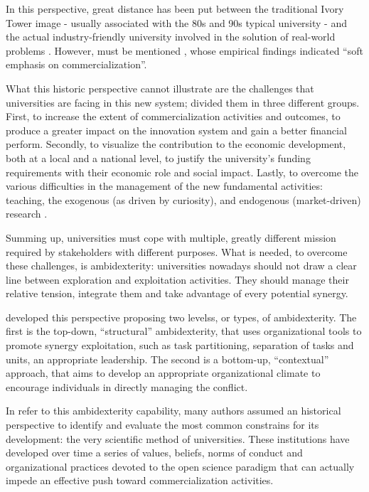 In this perspective, great distance has been put between the traditional Ivory Tower image - usually associated with the 80s and 90s typical university - and the actual industry-friendly university involved in the solution of real-world problems \citep{Baldini2006}. However, must be mentioned \citet{Rasmussen2006}, whose empirical findings indicated \enquote{soft emphasis on commercialization}.

What this historic perspective cannot illustrate are the challenges that universities are facing in this new system; \citet{Rasmussen2006} divided them in three different groups. First, to increase the extent of commercialization activities and outcomes, to produce a greater impact on the innovation system and gain a better financial perform. Secondly, to visualize the contribution to the economic development, both at a local and a national level, to justify the university's funding requirements with their economic role and social impact. Lastly, to overcome the various difficulties in the management of the new fundamental activities: teaching, the exogenous (as driven by curiosity), and endogenous (market-driven) research \citep{Debackere2005}. 

Summing up, universities must cope with multiple, greatly different mission required by stakeholders with different purposes. What is needed, to overcome these challenges, is ambidexterity: universities nowadays should not draw a clear line between exploration and exploitation activities. They should manage their relative tension, integrate them and take advantage of every potential synergy.

\citet{Chang2016} developed this perspective proposing two levelss, or types, of ambidexterity. The first is the top-down, \enquote{structural} ambidexterity, that uses organizational tools to promote synergy exploitation, such as task partitioning, separation of tasks and units, an appropriate leadership. The second is a bottom-up, \enquote{contextual} approach, that aims to develop an appropriate organizational climate to encourage individuals in directly managing the conflict.

In refer to this ambidexterity capability, many authors assumed an historical perspective to identify and evaluate the most common constrains for its development: the very scientific method of universities. These institutions have developed over time a series of values, beliefs, norms of conduct and organizational practices devoted to the open science paradigm that can actually impede an effective push toward commercialization activities. 

